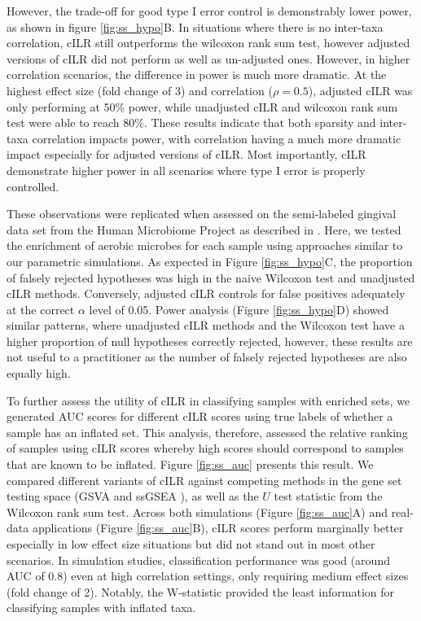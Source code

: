 \documentclass{article}
\begin{document}
However, the trade-off for good type I error control is demonstrably lower power, as shown in figure \ref{fig:ss_hypo}B. In situations where there is no inter-taxa correlation, cILR still outperforms the wilcoxon rank sum test, however adjusted versions of cILR did not perform as well as un-adjusted ones. However, in higher correlation scenarios, the difference in power is much more dramatic. At the highest effect size (fold change of 3) and correlation ($\rho = 0.5$), adjusted cILR was only performing at 50\% power, while unadjusted cILR and wilcoxon rank sum test were able to reach 80\%. These results indicate that both sparsity and inter-taxa correlation impacts power, with correlation having a much more dramatic impact especially for adjusted versions of cILR. Most importantly, cILR demonstrate higher power in all scenarios where type I error is properly controlled.    

These observations were replicated when assessed on the semi-labeled gingival data set from the Human Microbiome Project as described in . Here, we tested the enrichment of aerobic microbes for each sample using approaches similar to our parametric simulations. As expected in Figure \ref{fig:ss_hypo}C, the proportion of falsely rejected hypotheses was high in the naive Wilcoxon test and unadjusted cILR methods. Conversely, adjusted cILR controls for false positives adequately at the correct $\alpha$ level of 0.05. Power analysis (Figure \ref{fig:ss_hypo}D) showed similar patterns, where unadjusted cILR methods and the Wilcoxon test have a higher proportion of null hypotheses correctly rejected, however, these results are not useful to a practitioner as the number of falsely rejected hypotheses are also equally high.  

To further assess the utility of cILR in classifying samples with enriched sets, we generated AUC scores for different cILR scores using true labels of whether a sample has an inflated set. This analysis, therefore, assessed the relative ranking of samples using cILR scores whereby high scores should correspond to samples that are known to be inflated. Figure \ref{fig:ss_auc} presents this result. We compared different variants of cILR against competing methods in the gene set testing space (GSVA \cite{hanzelmann2013} and ssGSEA \cite{barbie2009}), as well as the $U$ test statistic from the Wilcoxon rank sum test. Across both simulations (Figure \ref{fig:ss_auc}A) and real-data applications (Figure \ref{fig:ss_auc}B), cILR scores perform marginally better especially in low effect size situations but did not stand out in most other scenarios. In simulation studies, classification performance was good (around AUC of 0.8) even at high correlation settings, only requiring medium effect sizes (fold change of 2). Notably, the W-statistic provided the least information for classifying samples with inflated taxa.
\end{document}
